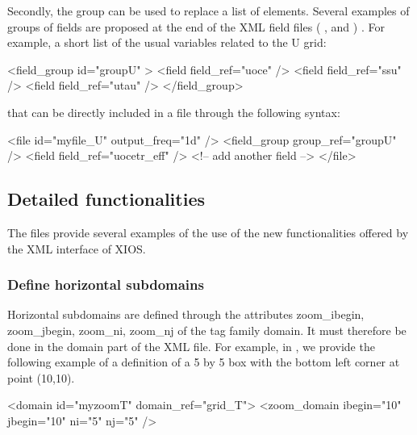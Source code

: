 \documentclass[../main/NEMO_manual]{subfiles}
\begin{document}
\noindent Secondly, the group can be used to replace a list of elements.
Several examples of groups of fields are proposed at the end of the XML field files (
,
 and
 ) .
For example, a short list of the usual variables related to the U grid:

\begin{xmllines}
<field_group id="groupU" >
   <field field_ref="uoce"  />
   <field field_ref="ssu" />
   <field field_ref="utau"  />
</field_group>
\end{xmllines}

\noindent that can be directly included in a file through the following syntax:

\begin{xmllines}
<file id="myfile_U" output_freq="1d" />
   <field_group group_ref="groupU" />
   <field field_ref="uocetr_eff"   />  <!-- add another field -->
</file>
\end{xmllines}

\subsection{Detailed functionalities}

The files  provide several examples of the use of
the new functionalities offered by the XML interface of XIOS.

\subsubsection{Define horizontal subdomains}

Horizontal subdomains are defined through the attributes zoom\_ibegin, zoom\_jbegin, zoom\_ni, zoom\_nj of
the tag family domain.
It must therefore be done in the domain part of the XML file.
For example, in , we provide the following example of a definition of
a 5 by 5 box with the bottom left corner at point (10,10).

\begin{xmllines}
<domain id="myzoomT" domain_ref="grid_T">
    <zoom_domain ibegin="10" jbegin="10" ni="5" nj="5" />
\end{xmllines}
\end{document}
